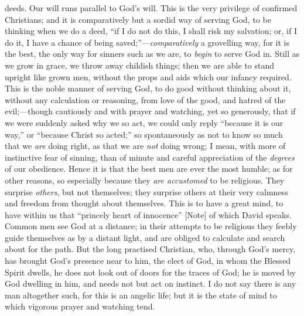 deeds. Our will runs parallel to God's will. This is the
very privilege of confirmed Christians; and it is
comparatively but a sordid way of serving God, to be
thinking when we do a deed, ``if I do not do this, I
shall risk my salvation; or, if I do it, I have a chance
of being saved;''—\emph{comparatively} a
grovelling way, for it is the best, the only way for
sinners such as we are, to \emph{begin} to serve God
in. Still as we grow in grace, we throw away childish
things; then we are able to stand upright like grown men,
without the props and aids which our infancy required.
This is the noble manner of serving God, to do good
without thinking about it, without any calculation or
reasoning, from love of the good, and hatred of the
evil;—though cautiously and with prayer and
watching, yet so generously, that if we were suddenly
asked why we so act, we could only reply ``because it
is our way,'' or ``because Christ so acted;''
so spontaneously as not to know so much that we \emph{are}
doing right, as that we are \emph{not} doing wrong; I
mean, with more of instinctive fear of sinning, than of
minute and careful appreciation of the \emph{degrees}
of our obedience. Hence it is that the best men are ever
the most humble; as for other reasons, so especially
because they \emph{are accustomed} to be religious.
They surprise \emph{others}, but not themselves; they
surprise others at their very calmness and freedom from
thought about themselves. This is to have a great mind,
to have within us that ``princely heart of
innocence'' [Note]
of which David speaks. Common men see God at a distance;
in their attempts to be religious they feebly guide
themselves as by a distant light, and are obliged to
calculate and search about for the path. But the long
practised Christian, who, through God's mercy, has
brought God's presence near to him, the elect of God, in
whom the Blessed Spirit dwells, he does not look out of
doors for the traces of God; he is moved by God dwelling
in him, and needs not but act on instinct. I do not say
there is any man altogether such, for this is an angelic
life; but it is the state of mind to which vigorous
prayer and watching tend.

